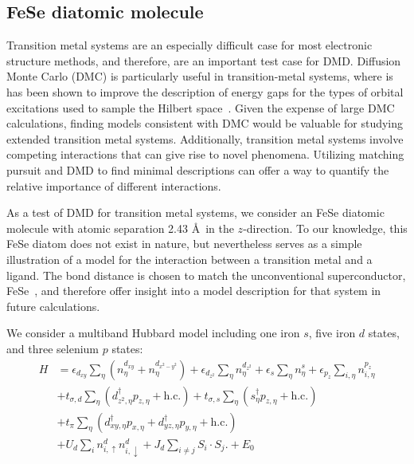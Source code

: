 \subsection{FeSe diatomic molecule}
\label{subsection:fese}
Transition metal systems are an especially difficult case for most electronic structure methods, and therefore, are an 
important test case for DMD. 
Diffusion Monte Carlo (DMC) is particularly useful in transition-metal systems, where is has been shown to improve the description of energy gaps for the types of orbital excitations used to sample the Hilbert space~\cite{lucas}.
Given the expense of large DMC calculations, finding models consistent with DMC would be valuable for studying extended transition metal systems. Additionally, transition metal systems involve competing interactions that can give rise to novel phenomena. 
Utilizing matching pursuit and DMD to find minimal descriptions can offer a way to quantify the relative importance of different interactions.

As a test of DMD for transition metal systems, we consider an FeSe diatomic molecule with atomic separation 2.43 \AA~in the $z$-direction.
To our knowledge, this FeSe diatom does not exist in nature, but nevertheless serves as a simple illustration of a model for the interaction between a transition metal and a ligand. The bond distance is chosen to match the unconventional superconductor, FeSe~\cite{fese}, and therefore offer insight into a model description for that system in future calculations.

We consider a multiband Hubbard model including one iron $s$, five iron $d$ states, and three selenium $p$ states:
\begin{align*}
  H 
  &=
  \epsilon_{d_{xy}} \sum_{\eta} (n^{d_{xy}}_{\eta}  + n^{d_{x^2-y^2}}_{\eta})
  +
  \epsilon_{d_{z^2}} \sum_{\eta} n^{d_{z^2}}_{\eta} 
  +
  \epsilon_s \sum_{\eta} n^{s}_{\eta} 
  +
  \epsilon_{p_{z}} \sum_{i,\eta} n^{p_{z}}_{i,\eta} 
  \\
  &+ 
  t_{\sigma,d} \sum_{\eta} \left( d_{z^2,\eta}^{\dagger} p_{z,\eta} + \text{h.c.} \right)
  +
  t_{\sigma,s} \sum_{\eta} \left(s_{\eta}^{\dagger}  p_{z,\eta} + \text{h.c.} \right)
  \\
  &+ 
  t_{\pi} \sum_{\eta} \left( d_{xy,\eta}^{\dagger} p_{x,\eta} + d_{yz,\eta}^{\dagger}  p_{y,\eta} + \text{h.c.} \right)
  \\
  &+
  U_d \sum_{i} n^{d}_{i,\uparrow} n^{d}_{i,\downarrow} 
  +
  J_d \sum_{i\ne j} S_i \cdot S_j.
  +
  E_0
\end{align*}

